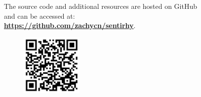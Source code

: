 \newpage

\vspace*{\fill}
\setcounter{figure}{0}
\setcounter{table}{0}
\begin{center}
    The source code and additional resources are hosted on GitHub \\and can be accessed at: \\\textbf{\href{https://github.com/zachycn/sentirhy}{https://github.com/zachycn/sentirhy}}.
    \begin{figure}[H]
        \centering
        \includegraphics[width=3cm]{Images/qr-code.png}
        \label{fig:qr-code}
    \end{figure}
\end{center}

\vspace*{\fill}